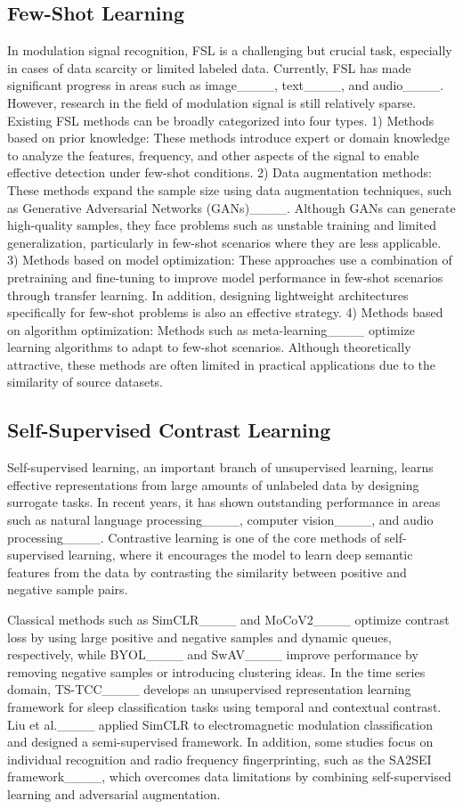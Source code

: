 \subsection{Few-Shot Learning}
In modulation signal recognition, FSL is a challenging but crucial task, especially in cases of data scarcity or limited labeled data. Currently, FSL has made significant progress in areas such as image____, text____, and audio____. However, research in the field of modulation signal is still relatively sparse. Existing FSL methods can be broadly categorized into four types. 1) Methods based on prior knowledge: These methods introduce expert or domain knowledge to analyze the features, frequency, and other aspects of the signal to enable effective detection under few-shot conditions. 2) Data augmentation methods: These methods expand the sample size using data augmentation techniques, such as Generative Adversarial Networks (GANs)____. Although GANs can generate high-quality samples, they face problems such as unstable training and limited generalization, particularly in few-shot scenarios where they are less applicable. 3) Methods based on model optimization: These approaches use a combination of pretraining and fine-tuning to improve model performance in few-shot scenarios through transfer learning. In addition, designing lightweight architectures specifically for few-shot problems is also an effective strategy. 4) Methods based on algorithm optimization: Methods such as meta-learning____ optimize learning algorithms to adapt to few-shot scenarios. Although theoretically attractive, these methods are often limited in practical applications due to the similarity of source datasets.

\subsection{Self-Supervised Contrast Learning}
Self-supervised learning, an important branch of unsupervised learning, learns effective representations from large amounts of unlabeled data by designing surrogate tasks. In recent years, it has shown outstanding performance in areas such as natural language processing____, computer vision____, and audio processing____. Contrastive learning is one of the core methods of self-supervised learning, where it encourages the model to learn deep semantic features from the data by contrasting the similarity between positive and negative sample pairs.

Classical methods such as SimCLR____ and MoCoV2____ optimize contrast loss by using large positive and negative samples and dynamic queues, respectively, while BYOL____ and SwAV____ improve performance by removing negative samples or introducing clustering ideas. In the time series domain, TS-TCC____ develops an unsupervised representation learning framework for sleep classification tasks using temporal and contextual contrast. Liu et al.____ applied SimCLR to electromagnetic modulation classification and designed a semi-supervised framework. In addition, some studies focus on individual recognition and radio frequency fingerprinting, such as the SA2SEI framework____, which overcomes data limitations by combining self-supervised learning and adversarial augmentation.

